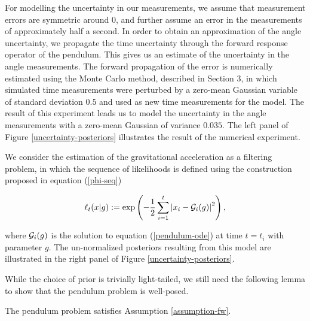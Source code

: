 For modelling the uncertainty in our measurements, we assume that measurement errors are symmetric around $0$, and further assume an error in the measurements of approximately half a second. In order to obtain an approximation of the angle uncertainty, we propagate the time uncertainty through the forward response operator of the pendulum. This gives us an estimate of the uncertainty in the angle measurements. The forward propagation of the error is numerically estimated using the Monte Carlo method, described in Section 3, in which simulated time measurements were perturbed by a zero-mean Gaussian variable of standard deviation $0.5$ and used as new time measurements for the model. The result of this experiment leads us to model the uncertainty in the angle measurements with a zero-mean Gaussian of variance $0.035$. The left panel of Figure \ref{uncertainty-posteriors} illustrates the result of the numerical experiment.

We consider the estimation of the gravitational acceleration as a filtering problem, in which the sequence of likelihoods is defined using the construction proposed in equation (\ref{phi-seq})

\begin{equation}\label{pendulum-weights}
  \ell_t(x|g) := \exp\left(-\frac12\sum_{i=1}^t\left|x_i - \mathcal{G}_i(g)\right|^2\right),
\end{equation}

where $\mathcal{G}_i(g)$ is the solution to equation (\ref{pendulum-ode}) at time $t = t_i$ with parameter $g$. The un-normalized posteriors resulting from this model are illustrated in the right panel of Figure \ref{uncertainty-posteriors}.

While the choice of prior is trivially light-tailed, we still need the following lemma to show that the pendulum problem is well-posed.

\begin{lemma} The pendulum problem satisfies Assumption \ref{assumption-fw}.
\end{lemma}

